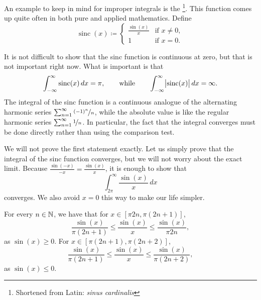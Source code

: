 \begin{example}
An example to keep in mind for improper integrals
is the \emph{}%
\footnote{Shortened from Latin: \emph{sinus cardinalis}}.
This function comes up quite often
in both pure and applied mathematics.  Define
\begin{equation*}
\operatorname{sinc}(x) \coloneqq
\begin{cases}
\frac{\sin(x)}{x} & \text{if } x \neq 0 , \\
1 & \text{if } x = 0 .
\end{cases}
\end{equation*}
\begin{myfigureht}
\caption{The sinc function.\label{figsinc}}
\end{myfigureht}

It is not difficult to show that
the sinc function is continuous at zero, but that is
not important right now.  What is important is that
\begin{equation*}
\int_{-\infty}^\infty \operatorname{sinc}(x) \,dx = \pi ,
\qquad \text{while} \qquad
\int_{-\infty}^\infty \bigl\lvert {\operatorname{sinc}(x)} \bigr\rvert \,dx = \infty .
\end{equation*}
The integral of the sinc function is a continuous analogue of the
alternating harmonic series $\sum_{n=1}^\infty \nicefrac{{(-1)}^n}{n}$, while the
absolute value is like the regular harmonic series $\sum_{n=1}^\infty \nicefrac{1}{n}$.
In particular, the fact that the integral converges must be done directly
rather than using the comparison test.

We will not prove the first statement exactly.  Let us simply prove
that the integral of the sinc function converges, but we will not worry
about the exact limit.  Because $\frac{\sin(-x)}{-x} = \frac{\sin(x)}{x}$, it is
enough to show that
\begin{equation*}
\int_{2\pi}^\infty \frac{\sin(x)}{x}\,dx
\end{equation*}
converges.  We
also avoid $x=0$ this way to make our life simpler.

For every $n \in {\mathbb{N}}$, we have that for $x \in [\pi 2n, \pi (2n+1)]$,
\begin{equation*}
\frac{\sin(x)}{\pi (2n+1)}
\leq
\frac{\sin(x)}{x}
\leq
\frac{\sin(x)}{\pi 2n} ,
\end{equation*}
as $\sin(x) \geq 0$.  For $x \in [\pi (2n+1), \pi (2n+2)]$,
\begin{equation*}
\frac{\sin(x)}{\pi (2n+1)}
\leq
\frac{\sin(x)}{x}
\leq
\frac{\sin(x)}{\pi (2n+2)} ,
\end{equation*}
as $\sin(x) \leq 0$.


\end{example}
